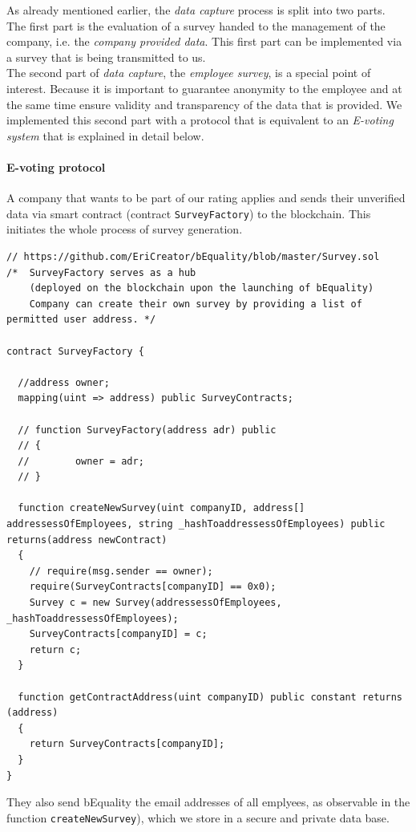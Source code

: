 As already mentioned earlier, the \textit{data capture} process is split into two parts.\\
The first part is the evaluation of a survey handed to the management of the company, i.e. the \textit{company provided data}. This first part can be implemented via a survey that is being transmitted to us.\\
The second part of \textit{data capture}, the \textit{employee survey}, is a special point of interest. Because it is important to guarantee anonymity to the employee and at the same time ensure validity and transparency of the data that is provided. We implemented this second part with a protocol that is equivalent to an \textit{E-voting system} that is explained in detail below.\\

\paragraph*{E-voting protocol}
A company that wants to be part of our rating applies and sends their unverified data via smart contract (contract \texttt{SurveyFactory}) to the blockchain. This initiates the whole process of survey generation.
\begin{lstlisting}
// https://github.com/EriCreator/bEquality/blob/master/Survey.sol
/*	SurveyFactory serves as a hub 
	(deployed on the blockchain upon the launching of bEquality)
	Company can create their own survey by providing a list of permitted user address. */

contract SurveyFactory {

  //address owner;
  mapping(uint => address) public SurveyContracts;

  // function SurveyFactory(address adr) public 
  // {
  //		owner = adr;
  // }

  function createNewSurvey(uint companyID, address[] addressessOfEmployees, string _hashToaddressessOfEmployees) public returns(address newContract)
  {
    // require(msg.sender == owner);
    require(SurveyContracts[companyID] == 0x0);
    Survey c = new Survey(addressessOfEmployees, _hashToaddressessOfEmployees);
    SurveyContracts[companyID] = c;
    return c;
  }
  
  function getContractAddress(uint companyID) public constant returns (address)
  {
    return SurveyContracts[companyID];
  }
}
\end{lstlisting}
They also send bEquality the email addresses of all emplyees, as observable in the function \texttt{createNewSurvey}), which we store in a secure and private data base.\\
